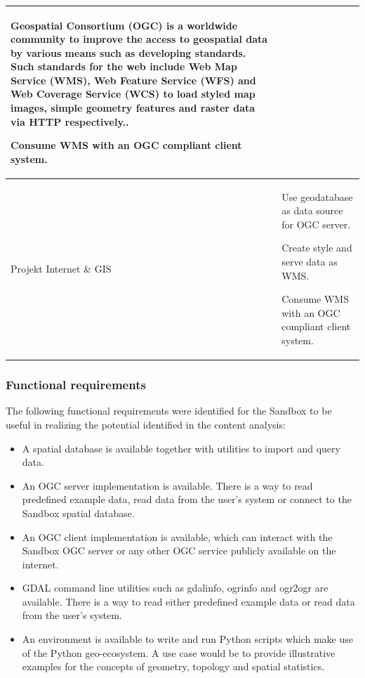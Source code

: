 \documentclass[11pt, a4paper, oneside, parskip=full-]{scrartcl}
\begin{document}
\begin{table}[!htbp]
\begin{tabularx}{\textwidth}{lX}
\begin{itemize}[left=0pt,nosep,before={\begin{minipage}[t]{\hsize}},after
      ={\end{minipage}}]
{      Geospatial Consortium (OGC) is a worldwide community to improve the access
      to geospatial data by various means such as developing standards. Such
      standards for the web include Web Map Service (WMS), Web Feature Service
      (WFS) and Web Coverage Service (WCS) to load styled map images, simple
      geometry features and raster data via HTTP respectively.}.
      \item Consume WMS with an OGC compliant client system.
      \end{itemize}\nointerlineskip \\
    \midrule
    Projekt Internet \& GIS &
      \begin{itemize}[left=0pt,nosep,before={\begin{minipage}[t]{\hsize}},after
      ={\end{minipage}}]
      \item Use geodatabase as data source for OGC server.
      \item Create style and serve data as WMS.
      \item Consume WMS with an OGC compliant client system.
      \end{itemize}\nointerlineskip \\
    \bottomrule
  \end{tabularx}%
\end{table}%

\subsubsection{Functional requirements}
The following functional requirements were identified for the Sandbox to be
useful in realizing the potential identified in the content analysis:
\begin{itemize}
  \item A spatial database is available together with utilities to import and
  query data.
  \item An OGC server implementation is available. There is a way to read
  predefined example data, read data from the user's system or connect to the
  Sandbox spatial database.
  \item An OGC client implementation is available, which can interact with the
  Sandbox OGC server or any other OGC service publicly available on the
  internet.
  \item GDAL\cite{gdal} command line utilities such as gdalinfo, ogrinfo and
  ogr2ogr are available. There is a way to read either predefined example data
  or read data from the user's system.
  \item An environment is available to write and run Python scripts which make
  use of the Python geo-ecosystem. A use case would be to provide illustrative
  examples for the concepts of geometry, topology and spatial statistics.
\end{itemize}
\end{document}
